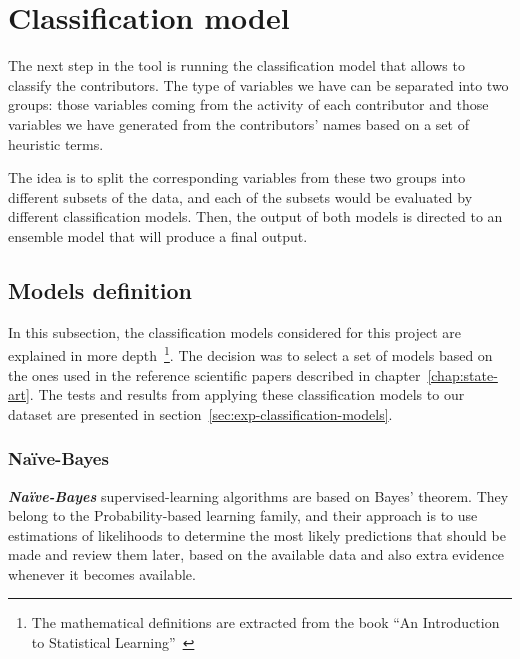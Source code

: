 \documentclass[a4paper, 12pt]{book}
\begin{document}
\section{Classification model} 
\label{sec:classification-model}

The next step in the tool is running the classification model that allows to classify the contributors. The type of variables we have can be separated into two groups: those variables coming from the activity of each contributor and those variables we have generated from the contributors' names based on a set of heuristic terms.

The idea is to split the corresponding variables from these two groups into different subsets of the data, and each of the subsets would be evaluated by different classification models. Then, the output of both models is directed to an ensemble model that will produce a final output.


\subsection{Models definition}
\label{ssec:models-definition}

In this subsection, the classification models considered for this project are explained in more depth~\footnote{The mathematical definitions are extracted from the book ``An Introduction to Statistical Learning''~\cite{introstatlearning}}. The decision was to select a set of models based on the ones used in the reference scientific papers described in chapter~\ref{chap:state-art}. The tests and results from applying these classification models to our dataset are presented in section~\ref{sec:exp-classification-models}.

\subsubsection{Naïve-Bayes}
\label{sssec:gaussian-naive-bayes}

\textit{\textbf{Naïve-Bayes}} supervised-learning algorithms are based on Bayes’ theorem. They belong to the Probability-based learning family, and their approach is to use estimations of likelihoods to determine the most likely predictions that should be made and review them later, based on the available data and also extra evidence whenever it becomes available.
\end{document}
